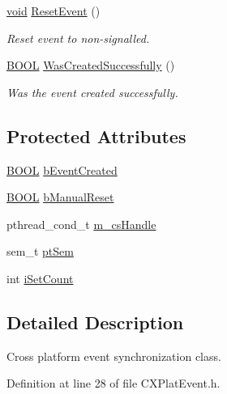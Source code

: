 \begin{DoxyCompactItemize}
\hyperlink{_cpclient_8h_a6464f7480a0fd0ee170cba12b2c0497f}{void} \hyperlink{class_c_x_plat_event_a1191adf0a0631aa8d0c8f78572b456be}{\-Reset\-Event} ()
\begin{DoxyCompactList}\small\item\em \-Reset event to non-\/signalled. \end{DoxyCompactList}\item 
\hyperlink{_cpclient_8h_a3be13892ae7076009afcf121347dd319}{\-B\-O\-O\-L} \hyperlink{class_c_x_plat_event_a252bc188f5077f656cbf2190dbd074b3}{\-Was\-Created\-Successfully} ()
\begin{DoxyCompactList}\small\item\em \-Was the event created successfully. \end{DoxyCompactList}\end{DoxyCompactItemize}
\subsection*{\-Protected \-Attributes}
\begin{DoxyCompactItemize}
\item 
\hyperlink{_cpclient_8h_a3be13892ae7076009afcf121347dd319}{\-B\-O\-O\-L} \hyperlink{class_c_x_plat_event_ace78909b8e610373b1ffb6fc4fde3ee6}{b\-Event\-Created}
\item 
\hyperlink{_cpclient_8h_a3be13892ae7076009afcf121347dd319}{\-B\-O\-O\-L} \hyperlink{class_c_x_plat_event_aa588099a688b7be58346f5b05d55eb91}{b\-Manual\-Reset}
\item 
pthread\-\_\-cond\-\_\-t \hyperlink{class_c_x_plat_event_ad452214355d4b5989c30ed1e7f137544}{m\-\_\-cs\-Handle}
\item 
sem\-\_\-t \hyperlink{class_c_x_plat_event_aebee3d1cc992443887951cd69642de35}{pt\-Sem}
\item 
int \hyperlink{class_c_x_plat_event_aad997af175335943b6eea0ba9f870df6}{i\-Set\-Count}
\end{DoxyCompactItemize}


\subsection{\-Detailed \-Description}
\-Cross platform event synchronization class. 

\-Definition at line 28 of file \-C\-X\-Plat\-Event.\-h.



